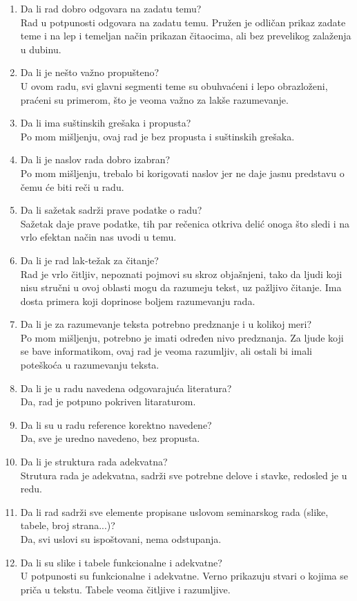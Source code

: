 \documentclass[a4paper]{report}
\begin{document}
\begin{enumerate}
\item Da li rad dobro odgovara na zadatu temu?\\
Rad u potpunosti odgovara na zadatu temu. Pružen je odličan prikaz zadate teme i na lep i temeljan način prikazan čitaocima, ali bez prevelikog zalaženja u dubinu.
\item Da li je nešto važno propušteno?\\
U ovom radu, svi glavni segmenti teme su obuhvaćeni i lepo obrazloženi, praćeni su primerom, što je veoma važno za lakše razumevanje.
\item Da li ima suštinskih grešaka i propusta?\\
Po mom mišljenju, ovaj rad je bez propusta i suštinskih grešaka.
\item Da li je naslov rada dobro izabran?\\
Po mom mišljenju, trebalo bi korigovati naslov jer ne daje jasnu predstavu o čemu će biti reči u radu. 
\item Da li sažetak sadrži prave podatke o radu?\\
Sažetak daje prave podatke, tih par rečenica otkriva delić onoga što sledi  i na vrlo efektan način nas uvodi u temu. 
\item Da li je rad lak-težak za čitanje?\\
Rad je vrlo čitljiv, nepoznati pojmovi su skroz objašnjeni, tako da ljudi koji nisu stručni u ovoj oblasti mogu da razumeju tekst, uz pažljivo čitanje. Ima dosta primera koji doprinose boljem razumevanju rada.
\item Da li je za razumevanje teksta potrebno predznanje i u kolikoj meri?\\
Po mom mišljenju, potrebno je imati određen nivo predznanja. Za ljude koji se bave informatikom, ovaj rad je veoma razumljiv, ali ostali bi imali poteškoća u razumevanju teksta.
\item Da li je u radu navedena odgovarajuća literatura?\\
Da, rad je potpuno pokriven litaraturom.
\item Da li su u radu reference korektno navedene?\\
Da, sve je uredno navedeno, bez propusta.
\item Da li je struktura rada adekvatna?\\
Strutura rada je adekvatna, sadrži sve potrebne delove i stavke, redosled je u redu.
\item Da li rad sadrži sve elemente propisane uslovom seminarskog rada (slike, tabele, broj strana...)?\\
Da, svi uslovi su ispoštovani, nema odstupanja.
\item Da li su slike i tabele funkcionalne i adekvatne? \\
U potpunosti su funkcionalne i adekvatne. Verno prikazuju stvari o kojima se priča u tekstu. Tabele veoma čitljive i razumljive.
\end{enumerate}
\end{document}
